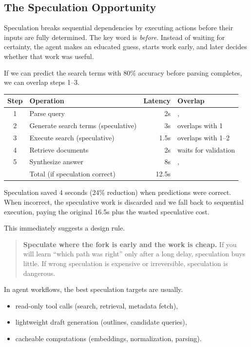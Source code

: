 \subsection{The Speculation Opportunity}

Speculation breaks sequential dependencies by executing actions before their inputs are fully determined. The key word is \emph{before}. Instead of waiting for certainty, the agent makes an educated guess, starts work early, and later decides whether that work was useful.

If we can predict the search terms with 80\% accuracy before parsing completes, we can overlap steps 1--3.

\begin{center}
\begin{tabular}{clrl}
\toprule
Step & Operation & Latency & Overlap \\
\midrule
1 & Parse query & 2s &, \\
2 & Generate search terms (speculative) & 3s & overlaps with 1 \\
3 & Execute search (speculative) & 1.5s & overlaps with 1--2 \\
4 & Retrieve documents & 2s & waits for validation \\
5 & Synthesize answer & 8s &, \\
\midrule
& Total (if speculation correct) & 12.5s & \\
\bottomrule
\end{tabular}
\end{center}

Speculation saved 4 seconds (24\% reduction) when predictions were correct. When incorrect, the speculative work is discarded and we fall back to sequential execution, paying the original 16.5s plus the wasted speculative cost.

This immediately suggests a design rule. \begin{quote}
\textbf{Speculate where the fork is early and the work is cheap.}
If you will learn ``which path was right'' only after a long delay, speculation buys little.
If wrong speculation is expensive or irreversible, speculation is dangerous.
\end{quote}

In agent workflows, the best speculation targets are usually.
\begin{itemize}
\item read-only tool calls (search, retrieval, metadata fetch),
\item lightweight draft generation (outlines, candidate queries),
\item cacheable computations (embeddings, normalization, parsing).
\end{itemize}

